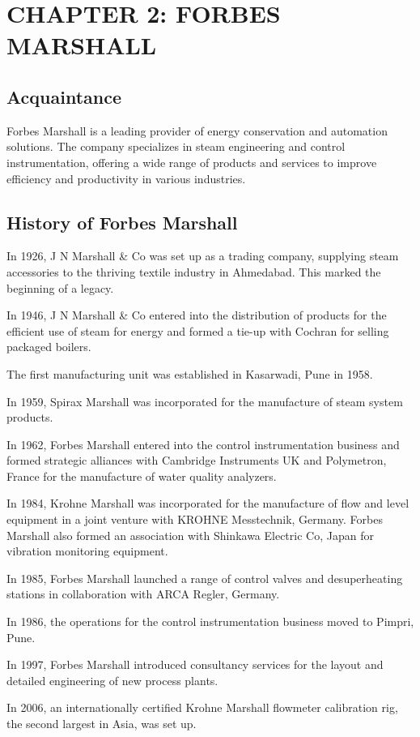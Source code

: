 \section {CHAPTER 2: FORBES MARSHALL}
\subsection{Acquaintance}
Forbes Marshall is a leading provider of energy conservation and automation solutions. The company specializes in steam engineering and control instrumentation, offering a wide range of products and services to improve efficiency and productivity in various industries.\cite{report_fm}

\subsection{History of Forbes Marshall}
In 1926, J N Marshall \& Co was set up as a trading company, supplying steam accessories to the thriving textile industry in Ahmedabad. This marked the beginning of a legacy.

In 1946, J N Marshall \& Co entered into the distribution of products for the efficient use of steam for energy and formed a tie-up with Cochran for selling packaged boilers.

The first manufacturing unit was established in Kasarwadi, Pune in 1958.

In 1959, Spirax Marshall was incorporated for the manufacture of steam system products.

In 1962, Forbes Marshall entered into the control instrumentation business and formed strategic alliances with Cambridge Instruments UK and Polymetron, France for the manufacture of water quality analyzers.

In 1984, Krohne Marshall was incorporated for the manufacture of flow and level equipment in a joint venture with KROHNE Messtechnik, Germany. Forbes Marshall also formed an association with Shinkawa Electric Co, Japan for vibration monitoring equipment.

In 1985, Forbes Marshall launched a range of control valves and desuperheating stations in collaboration with ARCA Regler, Germany.

In 1986, the operations for the control instrumentation business moved to Pimpri, Pune.

In 1997, Forbes Marshall introduced consultancy services for the layout and detailed engineering of new process plants.

In 2006, an internationally certified Krohne Marshall flowmeter calibration rig, the second largest in Asia, was set up.

